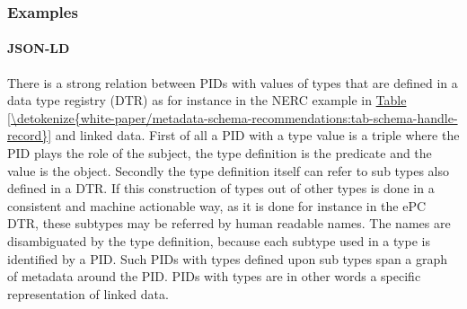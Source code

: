 \documentclass[a4paper,10pt,english]{sphinxmanual}
\begin{document}
\subsubsection{Examples}
\label{\detokenize{white-paper/landing-page-encoding:examples}}

\paragraph{JSON-LD}
\label{\detokenize{white-paper/landing-page-encoding:json-ld}}
There is a strong relation between PIDs with values of types that are
defined in a data type registry (DTR) as for instance in the NERC
example in \hyperref[\detokenize{white-paper/metadata-schema-recommendations:tab-schema-handle-record}]{Table \ref{\detokenize{white-paper/metadata-schema-recommendations:tab-schema-handle-record}}} and linked data. First
of all a PID with a type value is a triple where the PID plays the
role of the subject, the type definition is the predicate and the
value is the object. Secondly the type definition itself can refer to
sub types also defined in a DTR. If this construction of types out of
other types is done in a consistent and machine actionable way, as it
is done for instance in the ePC DTR, these subtypes may be referred by
human readable names. The names are disambiguated by the type
definition, because each subtype used in a type is identified by a
PID. Such PIDs with types defined upon sub types span a graph of
metadata around the PID. PIDs with types are in other words a specific
representation of linked data.
\end{document}
